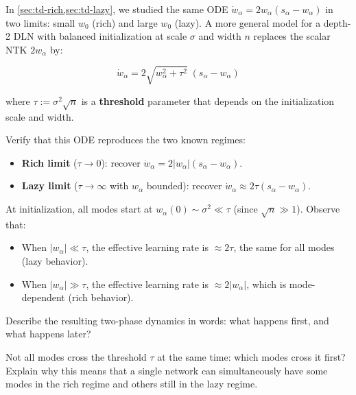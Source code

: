 \documentclass[11pt]{article}
\providecommand{\tightlist}{%
  \setlength{\itemsep}{0pt}\setlength{\parskip}{0pt}}
\begin{document}
\begin{exercise}
\label{ex:td-5a}
In \cref{sec:td-rich,sec:td-lazy}, we
studied the same ODE \(\dot{w}_\alpha = 2w_\alpha(s_\alpha - w_\alpha)\)
in two limits: small \(w_0\) (rich) and large \(w_0\) (lazy). A more
general model for a depth-2 DLN with balanced initialization at scale
\(\sigma\) and width \(n\) replaces the scalar NTK \(2w_\alpha\) by:

\[\dot{w}_\alpha = 2\sqrt{w_\alpha^2 + \tau^2}\;(s_\alpha - w_\alpha)\]

where \(\tau := \sigma^2 \sqrt{n}\) is a \textbf{threshold} parameter
that depends on the initialization scale and width.

Verify that this ODE reproduces the two known regimes:

\begin{itemize}
\tightlist
\item
  \textbf{Rich limit} (\(\tau \to 0\)): recover
  \(\dot{w}_\alpha = 2|w_\alpha|(s_\alpha - w_\alpha)\).
\item
  \textbf{Lazy limit} (\(\tau \to \infty\) with \(w_\alpha\) bounded):
  recover \(\dot{w}_\alpha \approx 2\tau(s_\alpha - w_\alpha)\).
\end{itemize}
\end{exercise}


\begin{exercise}
\label{ex:td-5b}
At initialization, all modes
start at \(w_\alpha(0) \sim \sigma^2 \ll \tau\) (since
\(\sqrt{n} \gg 1\)). Observe that:

\begin{itemize}
\tightlist
\item
  When \(|w_\alpha| \ll \tau\), the effective learning rate is
  \(\approx 2\tau\), the same for all modes (lazy behavior).
\item
  When \(|w_\alpha| \gg \tau\), the effective learning rate is
  \(\approx 2|w_\alpha|\), which is mode-dependent (rich behavior).
\end{itemize}

Describe the resulting two-phase dynamics in words: what happens first,
and what happens later?
\end{exercise}


\begin{exercise}
\label{ex:td-5c}
Not all modes cross the
threshold \(\tau\) at the same time: which modes cross it first? Explain
why this means that a single network can simultaneously have some modes
in the rich regime and others still in the lazy regime.
\end{exercise}
\end{document}
